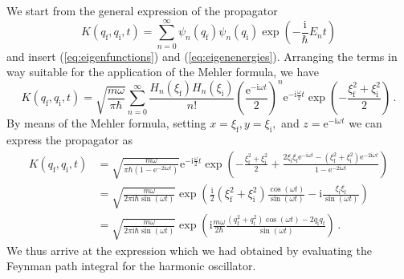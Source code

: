 \documentclass[11pt,DIV=19,parskip=half]{scrartcl}
\begin{document}
We start from the general expression of the propagator
\begin{equation}
  K(q_\text{f}, q_\text{i}, t) = \sum_{n=0}^\infty\psi_n(q_\text{f})\psi_n(q_\text{i})
				      \exp\!\left(-\frac{\text{i}}{\hbar}E_nt\right)
\end{equation}
and insert (\ref{eq:eigenfunctions}) and (\ref{eq:eigenenergies}). Arranging the terms
in way suitable for the application of the Mehler formula, we have
\begin{equation}
  K(q_\text{f}, q_\text{i}, t)
    = \sqrt{\frac{m\omega}{\pi\hbar}}\sum_{n=0}^\infty\frac{H_n(\xi_\text{f})H_n(\xi_\text{i})}{n!}
	\left(\frac{\text{e}^{-\text{i}\omega t}}{2}\right)^n\text{e}^{-\text{i}\frac{\omega}{2}t}
	\exp\!\left(-\frac{\xi_\text{f}^2+\xi_\text{i}^2}{2}\right)\,.
\end{equation}
By means of the Mehler formula, setting $x=\xi_\text{f}, y=\xi_\text{i},$ and
$z=\text{e}^{-\text{i}\omega t}$ we can express the propagator as
\begin{equation}
 \begin{aligned}
  K(q_\text{f}, q_\text{i}, t)
  &= \sqrt{\frac{m\omega}{\pi\hbar(1-\text{e}^{-2\text{i}\omega t})}}\text{e}^{-\text{i}\frac{\omega}{2}t}
     \exp\!\left(-\frac{\xi_\text{f}^2+\xi_\text{i}^2}{2}
 	+\frac{2\xi_\text{i}\xi_\text{f}\text{e}^{-\text{i}\omega t}
 	       -(\xi_\text{f}^2+\xi_\text{i}^2)\text{e}^{-2\text{i}\omega t}}
 	      {1-\text{e}^{-2\text{i}\omega t}}\right)\\
  &= \sqrt{\frac{m\omega}{2\pi\text{i}\hbar\sin(\omega t)}}
     \exp\!\left(\frac{\text{i}}{2}(\xi_\text{f}^2+\xi_\text{i}^2)\frac{\cos(\omega t)}{\sin(\omega t)}
	 -\text{i}\frac{\xi_\text{i}\xi_\text{f}}{\sin(\omega t)}\right)\\
  &= \sqrt{\frac{m\omega}{2\pi\text{i}\hbar\sin(\omega t)}}
     \exp\!\left(\text{i}\frac{m\omega}{2\hbar}\frac{(q_\text{f}^2+q_\text{i}^2)\cos(\omega t)
	 -2q_\text{i}q_\text{f}}{\sin(\omega t)}\right)\,.
 \end{aligned}
\end{equation}
We thus arrive at the expression which we had obtained by evaluating the Feynman path integral for 
the harmonic oscillator.
\end{document}
